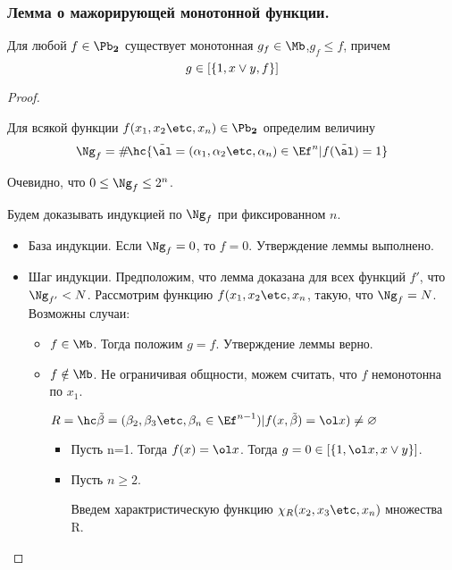 \documentclass[unicode,10pt]{article}
\begin{document}
\subsubsection{Лемма о мажорирующей монотонной функции.}
\begin{lemma}
  Для любой $f\in\PD$ существует монотонная $g_f\in\Mb$,$g_f\le f$, причем
  \begin{displaymath}
    g\in[\{1,x\vee{y},f\}]
  \end{displaymath}
\end{lemma}
\begin{proof}
  \begin{denote}
    Для всякой функции $f(\set[x]{n})\in\PD$ определим величину
    \begin{displaymath}
      \Ng_f=\#\!\hc{\alt=(\set{n})\in\Ef^n|f(\alt)=1}
    \end{displaymath}
    \begin{center}
      Очевидно, что $0\le\Ng_f\le2^n$.
    \end{center}
  \end{denote}
  Будем доказывать индукцией по $\Ng_f$ при фиксированном $n$.
  \begin{itemize}
    \item База индукции. Если $\Ng_f=0$, то $f=0$. Утверждение леммы выполнено.
    \item Шаг индукции. Предположим, что лемма доказана для всех функций $f'$, что $\Ng_{f'}<N$.
      Рассмотрим функцию $f(\set[x]{n}$, такую, что $\Ng_f=N$. Возможны случаи:
      \begin{itemize}
        \item $f\in\Mb$. Тогда положим $g=f$. Утверждение леммы верно.
        \item $f\notin\Mb$. Не ограничивая общности, можем считать, что $f$ немонотонна по $x_1$.
          \begin{denote}
            \begin{math}
              R = \setof{\tilde\beta=(\setf[\beta]{n}\in\Ef^{n-1})}{f(x,\tilde\beta)=\ol x)}\neq\varnothing
            \end{math}
          \end{denote}
          \begin{itemize}
            \item Пусть n=1. Тогда $f(x)=\ol x$. Тогда $g=0\in\cls{1,\ol x,\dn}$.
            \item Пусть $n\ge2$.
              \begin{denote}
                Введем характристическую функцию $\chi_R(\setf[x]{n})$ множества R.

\end{denote}
\end{itemize}
\end{itemize}
\end{itemize}
\end{proof}
\end{document}
